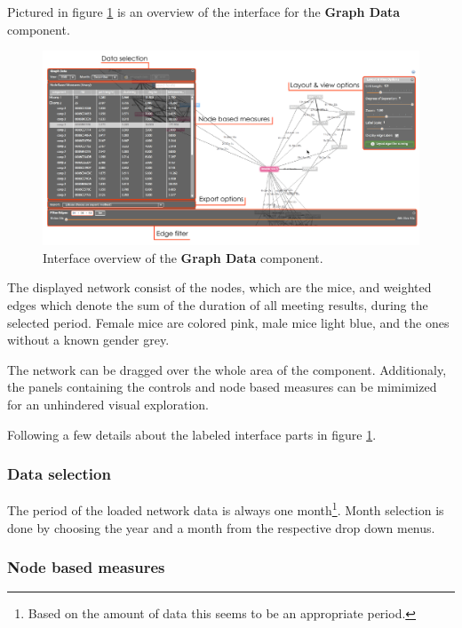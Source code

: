 Pictured in figure \ref{fig:graph_data_interface_overview} is an overview of the interface for the \textbf{Graph Data} component. 

\begin{figure}[!htpb]
\begin{center}
  \includegraphics[width=\textwidth]{assets/pdf/graph_data_interface_overview.pdf}
  \caption[Graph Data interface overview]{Interface overview of the \textbf{Graph Data} component.}
  \label{fig:graph_data_interface_overview}
\end{center}
\end{figure}

The displayed network consist of the nodes, which are the mice, and weighted edges which denote the sum of the duration of all meeting results, during the selected period. Female mice are colored pink, male mice light blue, and the ones without a known gender grey. 

The network can be dragged over the whole area of the component. Additionaly, the panels containing the controls and node based measures can be mimimized for an unhindered visual exploration.

Following a few details about the labeled interface parts in figure \ref{fig:graph_data_interface_overview}.

\subsubsection*{Data selection}
The period of the loaded network data is always one month\footnote{Based on the amount of data this seems to be an appropriate period.}. Month selection is done by choosing the year and a month from the respective drop down menus.  

\subsubsection*{Node based measures}

